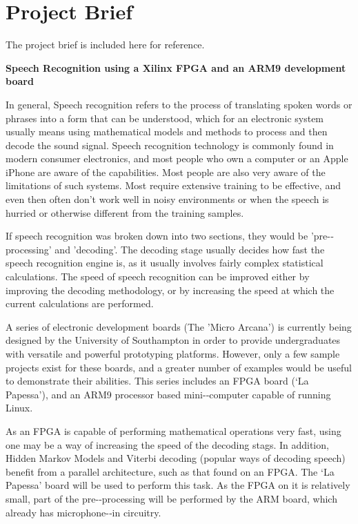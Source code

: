 \chapter{Project Brief} %
\label{apdx:brief}

The project brief is included here for reference.


\begin{center}
\textbf{Speech Recognition using a Xilinx FPGA and an ARM9 development board}
\end{center}

In general, Speech recognition refers to the process of translating spoken words or phrases into a form that can be understood, which for an electronic system usually means using mathematical models and methods to process and then decode the sound signal. Speech recognition technology is commonly found in modern consumer electronics, and most people who own a computer or an Apple iPhone are aware of the capabilities. Most people are also very aware of the limitations of such systems. Most require extensive training to be effective, and even then often don't work well in noisy environments or when the speech is hurried or otherwise different from the training samples.

If speech recognition was broken down into two sections, they would be 'pre-­‐ processing' and 'decoding'. The decoding stage usually decides how fast the speech recognition engine is, as it usually involves fairly complex statistical calculations. The speed of speech recognition can be improved either by improving the decoding methodology, or by increasing the speed at which the current calculations are performed.

A series of electronic development boards (The 'Micro Arcana') is currently being designed by the University of Southampton in order to provide undergraduates with versatile and powerful prototyping platforms. However, only a few sample projects exist for these boards, and a greater number of examples would be useful to demonstrate their abilities. This series includes an FPGA board (‘La Papessa’), and an ARM9 processor based mini-­‐computer capable of running Linux.

As an FPGA is capable of performing mathematical operations very fast, using one may be a way of increasing the speed of the decoding stags. In addition, Hidden Markov Models and Viterbi decoding (popular ways of decoding speech) benefit from a parallel architecture, such as that found on an FPGA. The ‘La Papessa’ board will be used to perform this task. As the FPGA on it is relatively small, part of the pre-­‐processing will be performed by the ARM board, which already has microphone-­‐in circuitry.

